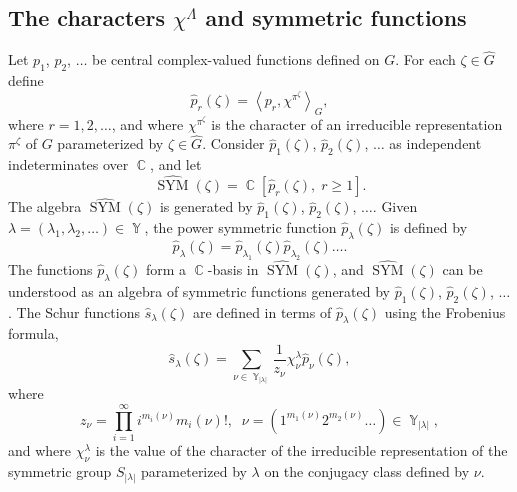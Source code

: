 \documentclass[12pt]{amsart}
\theoremstyle{definition}
\numberwithin{equation}{section}
\DeclareMathOperator{\SYM}{SYM}
\DeclareMathOperator{\Y}{\mathbb{Y}}
\DeclareMathOperator{\C}{\mathbb{C}}
\begin{document}
\subsection{The characters $\chi^{\Lambda}$ and symmetric functions}
Let $p_1$, $p_2$, $\ldots$ be central complex-valued functions defined on $G$.
For each $\zeta\in\widehat{G}$ define
\begin{equation}\label{ch1.3.3}
\widehat{p}_r(\zeta)=\left<p_r,\chi^{\pi^{\zeta}}\right>_G,
\end{equation}
where $r=1,2,\ldots$, and where $\chi^{\pi^{\zeta}}$ is the character of an irreducible representation $\pi^{\zeta}$ of $G$ parameterized by $\zeta\in \widehat{G}$.
Consider $\widehat{p}_1(\zeta)$, $\widehat{p}_2(\zeta)$, $\ldots$ as independent indeterminates over $\C$, and let
\begin{equation}
\widehat{\SYM}(\zeta)=\C\left[\widehat{p}_r(\zeta),\;r\geq 1\right].
\end{equation}
The algebra $\widehat{\SYM}(\zeta)$ is generated by $\widehat{p}_1(\zeta)$, $\widehat{p}_2(\zeta)$, $\ldots$.
Given $\lambda=(\lambda_1,\lambda_2,\ldots)\in \Y$, the power symmetric function $\widehat{p}_{\lambda}(\zeta)$ is defined by
$$
\widehat{p}_{\lambda}(\zeta)=\widehat{p}_{\lambda_1}(\zeta)\widehat{p}_{\lambda_2}(\zeta)\ldots.
$$
The functions $\widehat{p}_{\lambda}(\zeta)$ form a $\C$-basis in $\widehat{\SYM}(\zeta)$, and $\widehat{\SYM}(\zeta)$ can be understood as an algebra of symmetric functions generated by $\widehat{p}_1(\zeta)$, $\widehat{p}_2(\zeta)$, $\ldots$.
The Schur functions $\widehat{s}_{\lambda}(\zeta)$ are defined in terms of $\widehat{p}_{\lambda}(\zeta)$ using the Frobenius formula,
\begin{equation}\label{SF75}
\widehat{s}_{\lambda}(\zeta)=\sum\limits_{\nu\in\Y_{|\lambda|}}\frac{1}{z_{\nu}}
\chi^{\lambda}_{\nu}\widehat{p}_{\nu}(\zeta),
\end{equation}
where
$$
z_{\nu}=\prod\limits_{i=1}^{\infty}i^{m_i(\nu)}m_i(\nu)!,\;\; \nu=\left(1^{m_1(\nu)}2^{m_2(\nu)}\ldots\right)\in\Y_{|\lambda|},
$$
and where $\chi^{\lambda}_{\nu}$ is the value of the character of the irreducible representation of the symmetric group $S_{|\lambda|}$ parameterized by $\lambda$ on the conjugacy class defined by $\nu$.
\end{document}
